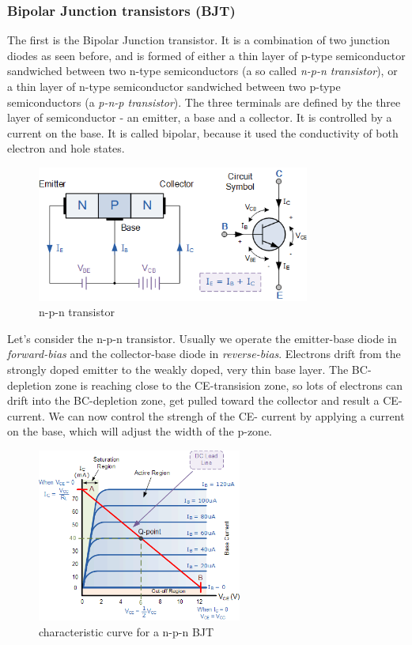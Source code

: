 \documentclass[11pt]{article}
\begin{document}
\subsubsection{Bipolar Junction transistors (BJT)}
The first is the Bipolar Junction transistor. It is a combination of two junction diodes as seen before, and is formed of either a thin layer of p-type semiconductor sandwiched between two n-type semiconductors (a so called \textit{n-p-n transistor}), or a thin layer of n-type semiconductor sandwiched between two p-type semiconductors (a  \textit{p-n-p transistor}). The three terminals are defined by the three layer of semiconductor - an emitter, a base and a collector. It is controlled by a current on the base. It is called bipolar, because it used the conductivity of both electron and hole states.
\begin{figure}[H]
\centering
\includegraphics[width=0.8\textwidth]{npn}%
\caption{n-p-n transistor}
\label{fig:npn}
\end{figure}

Let's consider the n-p-n transistor. Usually we operate the emitter-base diode in \textit{forward-bias} and the collector-base diode in \textit{reverse-bias}. Electrons drift from the strongly doped emitter to the weakly doped, very thin base layer. The BC-depletion zone is reaching close to the CE-transision zone, so lots of electrons can drift into the BC-depletion zone, get pulled toward the collector and result a CE-current. We can now control the strengh of the CE- current by applying a current on the base, which will adjust the width of the p-zone. 
\begin{figure}[H]
\centering
\includegraphics[width=0.6\textwidth]{kenn_npn.png}%
\caption{characteristic curve for a n-p-n BJT}
\label{fig:kenn_npn}
\end{figure}
\end{document}
